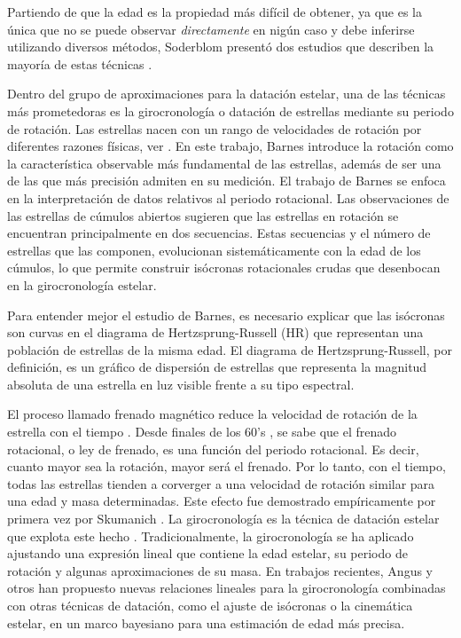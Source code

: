 Partiendo de que la edad es la propiedad más difícil de obtener, ya que es la única que no se puede observar \emph{directamente} en nigún caso y debe inferirse utilizando diversos métodos, Soderblom presentó dos estudios que describen la mayoría de estas técnicas \cite{Soderblom15, Soderblom10}.

Dentro del grupo de aproximaciones para la datación estelar, una de las técnicas más prometedoras es la girocronología o datación de estrellas mediante su periodo de rotación. Las estrellas nacen con un rango de velocidades de rotación por diferentes razones físicas, ver \cite{Barnes03}. En este trabajo, Barnes introduce la rotación como la característica observable más fundamental de las estrellas, además de ser una de las que más precisión admiten en su medición. El trabajo de Barnes se enfoca en la interpretación de datos relativos al periodo rotacional. Las observaciones de las estrellas de cúmulos abiertos sugieren que las estrellas en rotación se encuentran principalmente en dos secuencias. Estas secuencias y el número de estrellas que las componen, evolucionan sistemáticamente con la edad de los cúmulos, lo que permite construir isócronas rotacionales crudas que desenbocan en la girocronología estelar.

Para entender mejor el estudio de Barnes, es necesario explicar que las isócronas son curvas en el diagrama de Hertzsprung-Russell (HR) que representan una población de estrellas de la misma edad. El diagrama de Hertzsprung-Russell, por definición, es un gráfico de dispersión de estrellas que representa la magnitud absoluta de una estrella en luz visible frente a su tipo espectral.

El proceso llamado frenado magnético reduce la velocidad de rotación de la estrella con el tiempo \cite{Schatzman62}. Desde finales de los 60's \cite{Belcher76, Kawaler88, Mestel68, Mestel87, Weber67}, se sabe que el frenado rotacional, o ley de frenado, es una función del periodo rotacional. Es decir, cuanto mayor sea la rotación, mayor será el frenado. Por lo tanto, con el tiempo, todas las estrellas tienden a corverger a una velocidad de rotación similar para una edad y masa determinadas. Este efecto fue demostrado empíricamente por primera vez por Skumanich \cite{Skumanich72}. La girocronología es la técnica de datación estelar que explota este hecho \cite{Barnes16, Soderblom15}. Tradicionalmente, la girocronología se ha aplicado ajustando una expresión lineal que contiene la edad estelar, su periodo de rotación y algunas aproximaciones de su masa. En trabajos recientes, Angus y otros \cite{Angus20} \cite{Angus19} han propuesto nuevas relaciones lineales para la girocronología combinadas con otras técnicas de datación, como el ajuste de isócronas o la cinemática estelar, en un marco bayesiano para una estimación de edad más precisa. 

